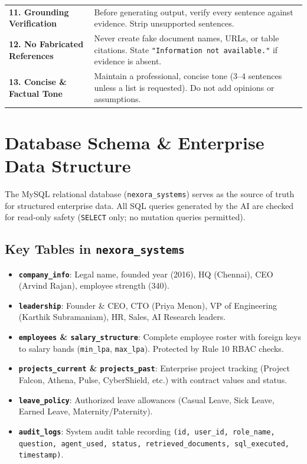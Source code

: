 \documentclass[11pt,a4paper]{article}
\begin{document}
\begin{longtable}{p{2.8cm} p{10cm}}
\addlinespace
\textbf{11. Grounding Verification} & Before generating output, verify every sentence against evidence. Strip unsupported sentences. \\
\addlinespace
\textbf{12. No Fabricated References} & Never create fake document names, URLs, or table citations. State \texttt{"Information not available."} if evidence is absent. \\
\addlinespace
\textbf{13. Concise \& Factual Tone} & Maintain a professional, concise tone (3--4 sentences unless a list is requested). Do not add opinions or assumptions. \\
\bottomrule
\end{longtable}

\section{Database Schema \& Enterprise Data Structure}

The MySQL relational database (\texttt{nexora\_systems}) serves as the source of truth for structured enterprise data. All SQL queries generated by the AI are checked for read-only safety (\texttt{SELECT} only; no mutation queries permitted).

\subsection{Key Tables in \texttt{nexora\_systems}}
\begin{itemize}[leftmargin=*]
    \item \textbf{\texttt{company\_info}}: Legal name, founded year (2016), HQ (Chennai), CEO (Arvind Rajan), employee strength (340).
    \item \textbf{\texttt{leadership}}: Founder \& CEO, CTO (Priya Menon), VP of Engineering (Karthik Subramaniam), HR, Sales, AI Research leaders.
    \item \textbf{\texttt{employees} \& \texttt{salary\_structure}}: Complete employee roster with foreign keys to salary bands (\texttt{min\_lpa}, \texttt{max\_lpa}). Protected by Rule 10 RBAC checks.
    \item \textbf{\texttt{projects\_current} \& \texttt{projects\_past}}: Enterprise project tracking (Project Falcon, Athena, Pulse, CyberShield, etc.) with contract values and status.
    \item \textbf{\texttt{leave\_policy}}: Authorized leave allowances (Casual Leave, Sick Leave, Earned Leave, Maternity/Paternity).
    \item \textbf{\texttt{audit\_logs}}: System audit table recording \texttt{(id, user\_id, role\_name, question, agent\_used, status, retrieved\_documents, sql\_executed, timestamp)}.
\end{itemize}
\end{document}
